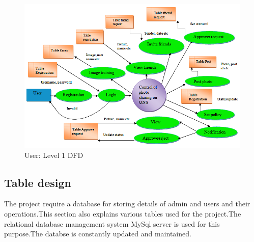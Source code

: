 \begin{figure}[H]
\begin{minipage}[c]{1\linewidth}
\begin{center}
\includegraphics[width=\textwidth]{nndfd5.png}
            \caption[User: Level 1 DFD]{ User: Level 1 DFD}
             \label{Posted photo on time line of Social Networking site}
\end{center}
  \end{minipage}            
\end{figure}
\clearpage

\subsection{Table design}
The project require a database for storing details of admin and users  and their operations.This section also explains various tables used for the project.The relational database management system MySql server is used for this purpose.The databse is constantly updated and maintained.

